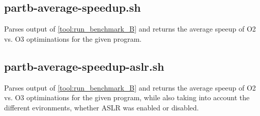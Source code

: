 \documentclass{article}
\begin{document}
\subsection{partb-average-speedup.sh} \label{tool:partb-average-speedup.sh}
Parses output of \ref{tool:run_benchmark_B} and returns the average speeup of O2 vs. O3 optiminations for the given program.

\subsection{partb-average-speedup-aslr.sh} \label{tool:partb-average-speedup-aslr.sh}
Parses output of \ref{tool:run_benchmark_B} and returns the average speeup of O2 vs. O3 optiminations for the given program, while also taking into account the different evironments, whether ASLR was enabled or disabled.
\end{document}
